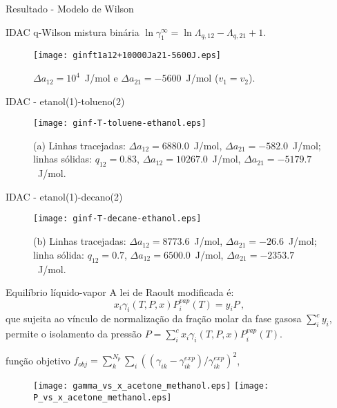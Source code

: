 \documentclass{beamer}
\begin{document}
\begin{frame}{Resultado - Modelo de Wilson}
	\begin{block}{IDAC q-Wilson mistura binária}
           $\ln \gamma_1^\infty = \ln \Lambda_{q,12} - \Lambda_{q,21} + 1.$
	\end{block}
\begin{figure}
\begin{center}
 \texttt{[image: ginft1a12+10000Ja21-5600J.eps]}
\end{center}
\caption{\label{fig:ginfty}%
         $\Delta a_{12}=10^4$~J/mol e $\Delta a_{21}=-5600$~J/mol
         ($v_1=v_2$). 
}
\end{figure}
\end{frame}

\begin{frame}{IDAC - etanol(1)-tolueno(2)}
\begin{figure}
\begin{center}
 \texttt{[image: ginf-T-toluene-ethanol.eps]}
\end{center}
\caption{\label{fig:ethanol}%
         (a) Linhas tracejadas: 
             $\Delta a_{12}= 6880.0$~J/mol, $\Delta a_{21}=-582.0$~J/mol;
             linhas sólidas: 
         $q_{12}=0.83$, 
         $\Delta a_{12}=10267.0$~J/mol, $\Delta a_{21}=-5179.7$~J/mol.
         }
\end{figure}
\end{frame}

		\begin{frame}{IDAC - etanol(1)-decano(2)}
\begin{figure}
\begin{center}
 \texttt{[image: ginf-T-decane-ethanol.eps]}
\end{center}
\caption{\label{fig:ethanol2}%
         (b) Linhas tracejadas: 
             $\Delta a_{12}= 8773.6$~J/mol, $\Delta a_{21}=-26.6$~J/mol;
             linha sólida: 
         $q_{12}=0.7$, $\Delta a_{12}=6500.0$~J/mol, 
         $\Delta a_{21}=-2353.7$~J/mol.}
\end{figure}
\end{frame}

\begin{frame}{Equilíbrio líquido-vapor}
A lei de Raoult modificada é:	%
\begin{equation}
	\label{eq:mraoultlaw}
	x_i \gamma_i(T,P,x) P_{i}^{vap}(T)  = y_iP\,,
\end{equation}
que sujeita ao vínculo de normalização da fração molar da fase gasosa $\sum_i^{c} y_i $, 
permite o isolamento da pressão $P = \sum_i^{c} x_i \gamma_i(T,P,x) P_{i}^{vap}(T)$. 
	\begin{block}{função objetivo}
		$f_{obj} = \sum_k^{N_{p}}\sum_i ((\gamma_{ik} - \gamma_{ik}^{exp})/ \gamma_{ik}^{exp})^2$,
	\end{block}
\begin{figure}
\texttt{[image: gamma\_vs\_x\_acetone\_methanol.eps]}
\texttt{[image: P\_vs\_x\_acetone\_methanol.eps]}
        \end{figure}
\end{frame}
\end{document}
